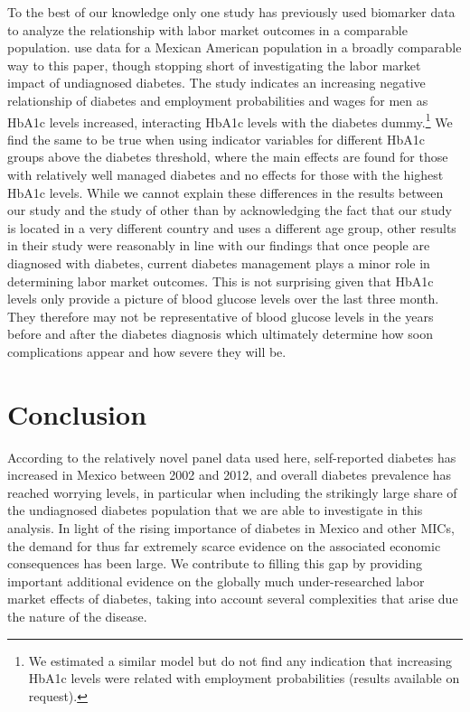 \documentclass[12pt,english,british]{article}
\begin{document}
To the best of our knowledge only one study has previously used biomarker data to analyze the relationship with labor market outcomes in a comparable population. \citet{BrownIII2011} use data for a Mexican American
population in a broadly comparable way to this paper, though stopping short of investigating
the labor market impact of undiagnosed diabetes. The study indicates
an increasing negative relationship of diabetes and employment
probabilities and wages for men as \ac{HbA1c} levels increased, interacting \ac{HbA1c} levels
with the diabetes dummy.\footnote{We estimated a similar model but
do not find any indication that increasing \ac{HbA1c} levels were
related with employment probabilities (results available on request).} We
find the same to be true when using indicator variables for different
\ac{HbA1c} groups above the diabetes threshold, where the main effects
are found for those with relatively well managed diabetes and no
effects for those with the highest \ac{HbA1c} levels. While we cannot explain these differences in the results between our study and the study of \citet{BrownIII2011} other than by acknowledging the fact that our study is located in a very different country and uses a different age group, other results in their study were reasonably in line with our findings that once people are diagnosed with diabetes, current diabetes management plays a minor role in determining labor market outcomes. This is not surprising given that \ac{HbA1c} levels only provide a picture of blood glucose levels over the last three month. They therefore may not be representative of blood glucose levels in the years before and after the diabetes diagnosis which ultimately determine how soon complications appear and how severe they will be.

\section{\label{sec:Conclusion}Conclusion}

According to the relatively novel panel data used here, self-reported diabetes has increased in Mexico between 2002 and 2012, and overall
diabetes prevalence has reached worrying
levels, in particular when including the strikingly large share of the undiagnosed diabetes population that we are able to investigate in this analysis. In light of the rising importance of diabetes in Mexico and other \ac{MICs}, the demand for  thus far extremely scarce evidence on the associated economic consequences has been large. We contribute to filling this gap by providing important additional evidence on the globally much under-researched labor market effects of diabetes, taking into account several complexities that arise due the nature of the disease.
\end{document}
